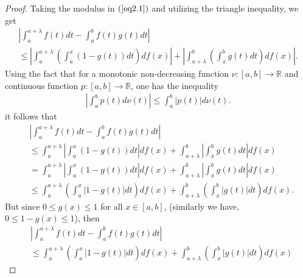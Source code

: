 \documentclass{amsart}
\theoremstyle{plain}
\numberwithin{equation}{section}
\begin{document}
\begin{proof}
Taking the modulus in $(\ref{eq2.1})$ and utilizing the triangle
inequality, we get
\begin{multline*}
\left| {\int_a^{a + \lambda } {f\left( t \right)dt}  - \int_a^b
{f\left( t \right)g\left( t \right)dt} } \right|
\\
\le  \left| {\int_a^{a + \lambda } {\left( {\int_a^x {\left( {1 -
g\left( t \right)} \right)dt} } \right)df\left( x \right)} }
\right| + \left| {\int_{a + \lambda }^b {\left( {\int_x^b {g\left(
t \right)dt} } \right)df\left( x \right)} } \right|.
\end{multline*}
Using the fact that for a monotonic non-decreasing function
$\nu:[a,b] \to \mathbb{R}$ and continuous function $p:[a,b] \to
\mathbb{R}$, one has the inequality
\begin{align}
\left| {\int_a^b {p\left( t \right)d\nu\left( t \right)} } \right|
\le \int_a^b {\left| {p\left( t \right)} \right|d\nu \left( t
\right)}. \label{eq2.14}
\end{align}
it follows that
\begin{align*}
&\left| {\int_a^{a + \lambda } {f\left( t \right)dt}  - \int_a^b
{f\left( t \right)g\left( t \right)dt} } \right|
\\
&\le \int_a^{a + \lambda } { \left| {\int_a^x {\left( {1 - g\left(
t \right)} \right)dt} } \right|df\left( x \right)}+ \int_{a +
\lambda }^b {\left| {\int_x^b {g\left( t \right)dt} }
\right|df\left( x \right)}
\\
&= \int_a^{a + \lambda } { \left| {\int_a^x {\left( {1 - g\left( t
\right)} \right)dt} } \right|df\left( x \right)}+\int_{a + \lambda
}^b {\left| {\int_x^b {g\left( t \right)dt} } \right|df\left( x
\right)}
\\
&\le \int_a^{a + \lambda } {\left( { \int_a^x {\left| {1 - g\left(
t \right)} \right|dt}} \right) df\left( x \right)}+\int_{a +
\lambda }^b { \left( {\int_x^b {\left| {g\left( t \right)}
\right|dt}} \right) df\left( x \right)}.
\end{align*}
But since $0 \le g(x) \le 1$ for all $x\in [a,b]$, (similarly we
have, $ 0 \le 1 - g(x) \le 1$), then
\begin{align}
&\left| {\int_a^{a + \lambda } {f\left( t \right)dt}  - \int_a^b
{f\left( t \right)g\left( t \right)dt} } \right|
\nonumber\\
&\le \int_a^{a + \lambda } {\left( { \int_a^x {\left| {1 - g\left(
t \right)} \right|dt}} \right) df\left( x \right)}+\int_{a +
\lambda }^b { \left( {\int_x^b {\left| {g\left( t \right)}
\right|dt}} \right) df\left( x \right)}

\end{align}
\end{proof}
\end{document}
